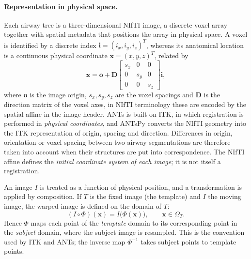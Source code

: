 \paragraph{Representation in physical space.}  %
Each airway tree is a three-dimensional NIfTI image, a discrete voxel array
together with spatial metadata that positions the array in physical space. A
voxel is identified by a discrete index $\mathbf{i}=(i_x,i_y,i_z)^T$, whereas its
anatomical location is a continuous physical coordinate
$\mathbf{x}=(x,y,z)^T$, related by
\begin{equation}
  \mathbf{x} = \mathbf{o} + \mathbf{D}
  \begin{bmatrix}
    s_x & 0   & 0   \\
    0   & s_y & 0   \\
    0   & 0   & s_z
  \end{bmatrix}
  \mathbf{i},
  \label{eq:index_to_physical}   %
\end{equation}
where $\mathbf{o}$ is the image origin, $s_x,s_y,s_z$ are the voxel spacings and
$\mathbf{D}$ is the direction matrix of the voxel axes, in NIfTI terminology these
are encoded by the spatial affine in the image header. ANTs is built on ITK, in
which registration is performed in \emph{physical coordinates}, and ANTsPy
converts the NIfTI geometry into the ITK representation of origin, spacing and
direction. Differences in origin, orientation or voxel spacing between two
airway segmentations are therefore taken into account when their structures are
put into correspondence. The NIfTI affine defines the \emph{initial coordinate
system of each image}; it is not itself a registration.

An image $I$ is treated as a function of physical position, and a transformation
is applied by composition. If $T$ is the fixed image (the template) and $I$ the
moving image, the warped image is defined on the domain of $T$:
\begin{equation}
  (I\circ\Phi)(\mathbf{x}) = I\big(\Phi(\mathbf{x})\big),
  \qquad \mathbf{x}\in\Omega_T .
  \label{eq:pullback}            %
\end{equation}
Hence $\Phi$ maps each point of the \emph{template} domain to its corresponding
point in the \emph{subject} domain, where the subject image is resampled. This is
the convention used by ITK and ANTs; the inverse map $\Phi^{-1}$ takes subject
points to template points.

